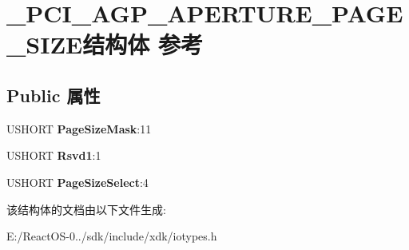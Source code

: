 \hypertarget{struct___p_c_i___a_g_p___a_p_e_r_t_u_r_e___p_a_g_e___s_i_z_e}{}\section{\+\_\+\+P\+C\+I\+\_\+\+A\+G\+P\+\_\+\+A\+P\+E\+R\+T\+U\+R\+E\+\_\+\+P\+A\+G\+E\+\_\+\+S\+I\+Z\+E结构体 参考}
\label{struct___p_c_i___a_g_p___a_p_e_r_t_u_r_e___p_a_g_e___s_i_z_e}
\subsection*{Public 属性}
\begin{DoxyCompactItemize}
\item 
\mbox{\label{struct___p_c_i___a_g_p___a_p_e_r_t_u_r_e___p_a_g_e___s_i_z_e_a37fbfebf70321f261800913e91447e64}} 
U\+S\+H\+O\+RT {\bfseries Page\+Size\+Mask}\+:11
\item 
\mbox{\label{struct___p_c_i___a_g_p___a_p_e_r_t_u_r_e___p_a_g_e___s_i_z_e_a5694142cb1b8b7e5351f9f9f60f07a69}} 
U\+S\+H\+O\+RT {\bfseries Rsvd1}\+:1
\item 
\mbox{\label{struct___p_c_i___a_g_p___a_p_e_r_t_u_r_e___p_a_g_e___s_i_z_e_a50a01e4b98caed862e5bb75b27f65c3f}} 
U\+S\+H\+O\+RT {\bfseries Page\+Size\+Select}\+:4
\end{DoxyCompactItemize}


该结构体的文档由以下文件生成\+:\begin{DoxyCompactItemize}
\item 
E\+:/\+React\+O\+S-\/0../sdk/include/xdk/iotypes.\+h\end{DoxyCompactItemize}
